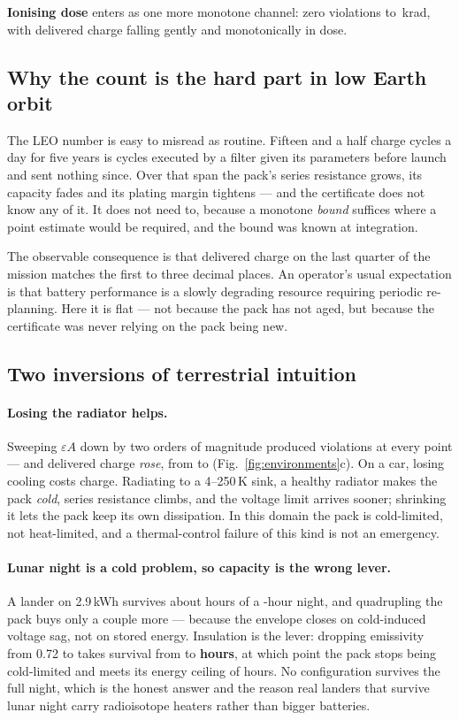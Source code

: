 \documentclass[11pt,letterpaper]{article}
\theoremstyle{definition}
\theoremstyle{remark}
\begin{document}
\textbf{Ionising dose} enters as one more monotone channel: zero violations to \sDoseMax{}\,krad,
with delivered charge falling gently and monotonically in dose.

\subsection{Why the count is the hard part in low Earth orbit}

The LEO number is easy to misread as routine. Fifteen and a half charge cycles a day for five
years is \sLeoCycles{} cycles executed by a filter given its parameters before launch and sent
nothing since. Over that span the pack's series resistance grows, its capacity fades and its
plating margin tightens --- and the certificate does not know any of it. It does not need to,
because a monotone \emph{bound} suffices where a point estimate would be required, and the bound
was known at integration.

The observable consequence is that delivered charge on the last quarter of the mission matches
the first to three decimal places. An operator's usual expectation is that battery performance
is a slowly degrading resource requiring periodic re-planning. Here it is flat --- not because
the pack has not aged, but because the certificate was never relying on the pack being new.

\subsection{Two inversions of terrestrial intuition}

\paragraph{Losing the radiator helps.} Sweeping $\varepsilon A$ down by two orders of magnitude
produced \sRadViol{} violations at every point --- and delivered charge \emph{rose}, from
\sRadLo{} to \sRadHi{} (Fig.~\ref{fig:environments}c). On a car, losing cooling costs charge.
Radiating to a 4--250\,K sink, a healthy radiator makes the pack \emph{cold}, series resistance
climbs, and the voltage limit arrives sooner; shrinking it lets the pack keep its own
dissipation. In this domain the pack is cold-limited, not heat-limited, and a thermal-control
failure of this kind is not an emergency.

\paragraph{Lunar night is a cold problem, so capacity is the wrong lever.} A lander on 2.9\,kWh
survives about \sNightBase{} hours of a \sNightHours{}-hour night, and quadrupling the pack buys
only a couple more --- because the envelope closes on cold-induced voltage sag, not on stored
energy. Insulation is the lever: dropping emissivity from 0.72 to \sNightBestEps{} takes
survival from \sNightBase{} to \textbf{\sNightBest{} hours}, at which point the pack stops being
cold-limited and meets its energy ceiling of \sNightEnergy{} hours. No configuration survives
the full night, which is the honest answer and the reason real landers that survive lunar night
carry radioisotope heaters rather than bigger batteries.
\end{document}
